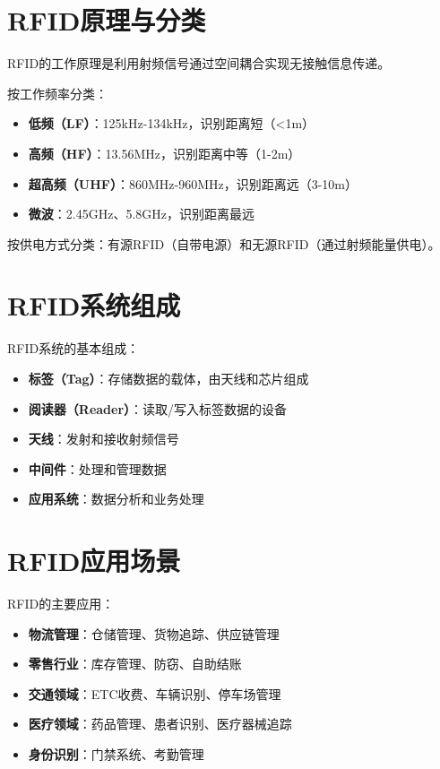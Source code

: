 \section{RFID原理与分类}
\label{sec:rfid_principle}

RFID的工作原理是利用射频信号通过空间耦合实现无接触信息传递。

按工作频率分类：
\begin{itemize}
    \item \textbf{低频（LF）}：125kHz-134kHz，识别距离短（<1m）
    \item \textbf{高频（HF）}：13.56MHz，识别距离中等（1-2m）
    \item \textbf{超高频（UHF）}：860MHz-960MHz，识别距离远（3-10m）
    \item \textbf{微波}：2.45GHz、5.8GHz，识别距离最远
\end{itemize}

按供电方式分类：有源RFID（自带电源）和无源RFID（通过射频能量供电）。

\section{RFID系统组成}
\label{sec:rfid_components}

RFID系统的基本组成：

\begin{itemize}
    \item \textbf{标签（Tag）}：存储数据的载体，由天线和芯片组成
    \item \textbf{阅读器（Reader）}：读取/写入标签数据的设备
    \item \textbf{天线}：发射和接收射频信号
    \item \textbf{中间件}：处理和管理数据
    \item \textbf{应用系统}：数据分析和业务处理
\end{itemize}

\section{RFID应用场景}
\label{sec:rfid_applications}

RFID的主要应用：

\begin{itemize}
    \item \textbf{物流管理}：仓储管理、货物追踪、供应链管理
    \item \textbf{零售行业}：库存管理、防窃、自助结账
    \item \textbf{交通领域}：ETC收费、车辆识别、停车场管理
    \item \textbf{医疗领域}：药品管理、患者识别、医疗器械追踪
    \item \textbf{身份识别}：门禁系统、考勤管理
\end{itemize}

